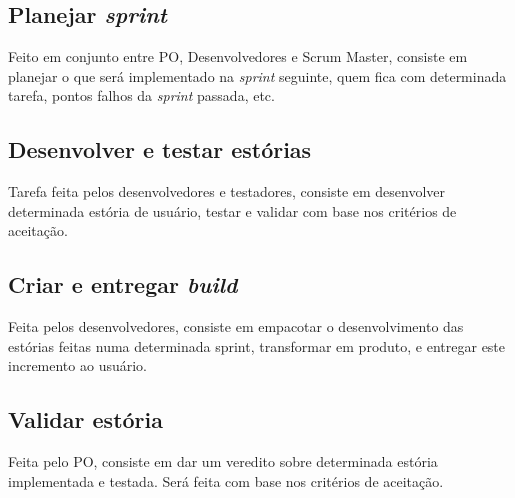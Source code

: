 \subsection{Planejar \emph{sprint}}
Feito em conjunto entre PO, Desenvolvedores e Scrum Master, consiste em planejar o que será implementado na \emph{sprint} seguinte, quem fica com determinada tarefa, pontos falhos da \emph{sprint} passada, etc.

\subsection{Desenvolver e testar estórias}
Tarefa feita pelos desenvolvedores e testadores, consiste em desenvolver determinada estória de usuário, testar e validar com base nos critérios de aceitação.

\subsection{Criar e entregar \emph{build}}
Feita pelos desenvolvedores, consiste em empacotar o desenvolvimento das estórias feitas numa determinada sprint, transformar em produto, e entregar este incremento ao usuário.

\subsection{Validar estória}
Feita pelo PO, consiste em dar um veredito sobre determinada estória implementada e testada. Será feita com base nos critérios de aceitação.